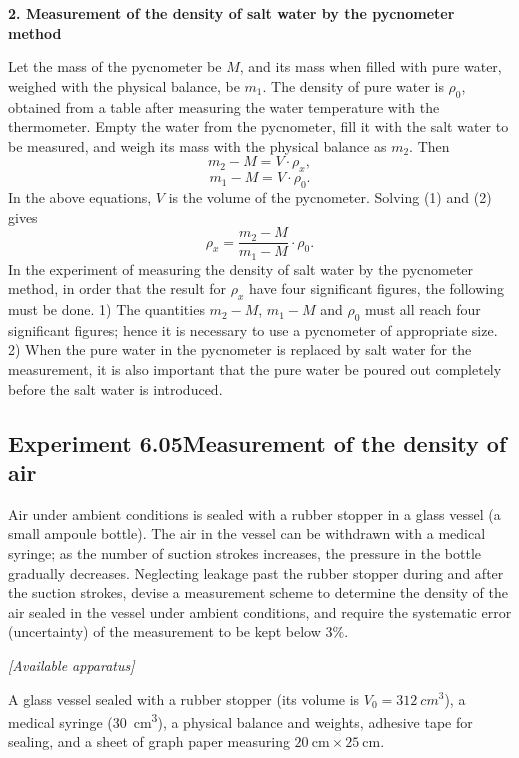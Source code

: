\textbf{2. Measurement of the density of salt water by the pycnometer method}

Let the mass of the pycnometer be $M$, and its mass when filled with pure water, weighed with the physical balance, be $m_1$. The density of pure water is $\rho_0$, obtained from a table after measuring the water temperature with the thermometer. Empty the water from the pycnometer, fill it with the salt water to be measured, and weigh its mass with the physical balance as $m_2$. Then
\begin{equation}\tag{1}
m_2-M=V\cdot\rho_x,
\end{equation}
\begin{equation}\tag{2}
m_1-M=V\cdot\rho_0.
\end{equation}
In the above equations, $V$ is the volume of the pycnometer. Solving (1) and (2) gives
\begin{equation}\tag{3}
\rho_x=\frac{m_2-M}{m_1-M}\cdot\rho_0.
\end{equation}
In the experiment of measuring the density of salt water by the pycnometer method, in order that the result for $\rho_x$ have four significant figures, the following must be done. 1) The quantities $m_2-M$, $m_1-M$ and $\rho_0$ must all reach four significant figures; hence it is necessary to use a pycnometer of appropriate size. 2) When the pure water in the pycnometer is replaced by salt water for the measurement, it is also important that the pure water be poured out completely before the salt water is introduced.

\subsection*{Experiment 6.05\quad Measurement of the density of air}

Air under ambient conditions is sealed with a rubber stopper in a glass vessel (a small ampoule bottle). The air in the vessel can be withdrawn with a medical syringe; as the number of suction strokes increases, the pressure in the bottle gradually decreases. Neglecting leakage past the rubber stopper during and after the suction strokes, devise a measurement scheme to determine the density of the air sealed in the vessel under ambient conditions, and require the systematic error (uncertainty) of the measurement to be kept below $3\%$.

\noindent\textit{[Available apparatus]}

A glass vessel sealed with a rubber stopper (its volume is $V_0=\SI{312}{cm^3}$), a medical syringe (\SI{30}{cm^3}), a physical balance and weights, adhesive tape for sealing, and a sheet of graph paper measuring $20\ \mathrm{cm}\times25\ \mathrm{cm}$.

